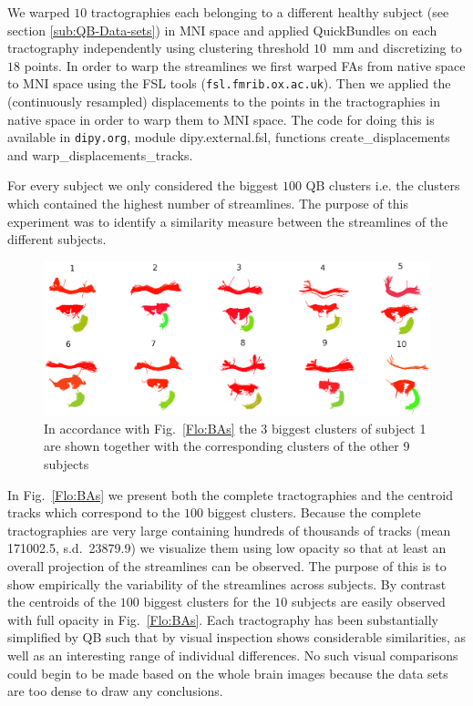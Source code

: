 \documentclass{bioinfo}
\begin{document}
We warped $10$ tractographies each belonging to a different healthy
subject (see section \ref{sub:QB-Data-sets}) in MNI space and applied
QuickBundles on each tractography independently using clustering
threshold $10$~mm and discretizing to $18$ points.  In order to warp the
streamlines we first warped FAs from native space to MNI space using the
FSL tools (\texttt{fsl.fmrib.ox.ac.uk}). Then we applied the (continuously
resampled) displacements to the points in the tractographies in native
space in order to warp them to MNI space. The code for doing this is
available in \texttt{dipy.org}, module dipy.external.fsl, functions
create\_displacements and warp\_displacements\_tracks.

For every subject we
only considered the biggest $100$ QB clusters i.e. the clusters which
contained the highest number of streamlines. The purpose of this
experiment was to identify a similarity measure between the
streamlines of the different subjects.

\begin{figure}[htp]
  \centerline{\includegraphics[width=180mm]{Figures/Fig_14_correspondences.eps}}
  \caption{In accordance with Fig.~\ref{Flo:BAs} the 3 biggest clusters of
  subject 1 are shown together with the corresponding clusters of the other 9 subjects \label{Flo:Corrs}}
\end{figure}


In Fig.~\ref{Flo:BAs} we present both the complete tractographies and
the centroid tracks which correspond to the $100$ biggest
clusters. Because the complete tractographies are very large containing
hundreds of thousands of tracks (mean \num{171002.5},
s.d.~\num{23879.9}) we visualize them using low opacity so that at least
an overall projection of the streamlines can be observed. The purpose of
this is to show empirically the variability of the streamlines across
subjects. By contrast the centroids of the $100$ biggest clusters for
the $10$ subjects are easily observed with full opacity in
Fig.~\ref{Flo:BAs}. Each tractography has been substantially simplified
by QB such that by visual inspection shows considerable similarities, as
well as an interesting range of individual differences. No such visual
comparisons could begin to be made based on the whole brain images
because the data sets are too dense to draw any conclusions.
\end{document}
